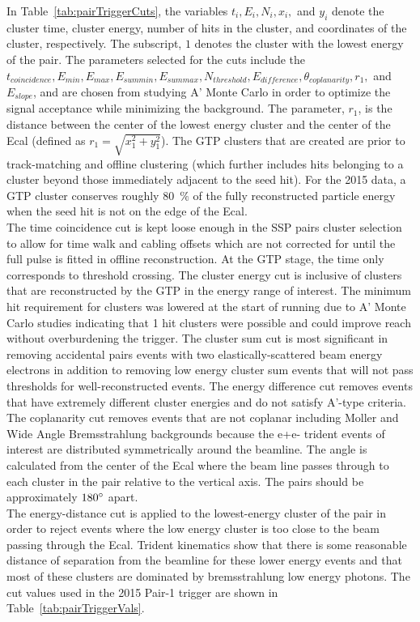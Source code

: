 \documentclass[12pt]{report}
\begin{document}
In Table~\ref{tab:pairTriggerCuts}, the variables $t_i,E_i, N_i, x_i,$ and $y_i$ denote the cluster time, cluster energy, number of hits in the cluster, and coordinates of the cluster, respectively. The subscript, $1$ denotes the cluster with the lowest energy of the pair. The parameters selected for the cuts include the $t_{coincidence}, E_{min}, E_{max}, E_{sum min}, E_{sum max}, N_{threshold}, E_{difference}, \theta_{coplanarity}, r_{1},$ and $E_{slope}$, and are chosen from studying A' Monte Carlo in order to optimize the signal acceptance while minimizing the background. The parameter, $r_1$, is the distance between the center of the lowest energy cluster and the center of the Ecal (defined as $r_1=\sqrt{x_1^2+y_1^2}$). The GTP clusters that are created are prior to track-matching and offline clustering (which further includes hits belonging to a cluster beyond those immediately adjacent to the seed hit). For the 2015 data, a GTP cluster conserves roughly 80~$\%$ of the fully reconstructed particle energy when the seed hit is not on the edge of the Ecal. \\
\indent The time coincidence cut is kept loose enough in the SSP pairs cluster selection to allow for time walk and cabling offsets which are not corrected for until the full pulse is fitted in offline reconstruction. At the GTP stage, the time only corresponds to threshold crossing. The cluster energy cut is inclusive of clusters that are reconstructed by the GTP in the energy range of interest. The minimum hit requirement for clusters was lowered at the start of running due to A' Monte Carlo studies indicating that 1 hit clusters were possible and could improve reach without overburdening the trigger. The cluster sum cut is most significant in removing accidental pairs events with two elastically-scattered beam energy electrons in addition to removing low energy cluster sum events that will not pass thresholds for well-reconstructed events. The energy difference cut removes events that have extremely different cluster energies and do not satisfy A'-type criteria. \\
\indent The coplanarity cut removes events that are not coplanar including Moller and Wide Angle Bremsstrahlung backgrounds because the e+e- trident events of interest are distributed symmetrically around the beamline. The angle is calculated from the center of the Ecal where the beam line passes through to each cluster in the pair relative to the vertical axis. The pairs should be approximately $180\degree$ apart. \\
\indent The energy-distance cut is applied to the lowest-energy cluster of the pair in order to reject events where the low energy cluster is too close to the beam passing through the Ecal. Trident kinematics show that there is some reasonable distance of separation from the beamline for these lower energy events and that most of these clusters are dominated by bremsstrahlung low energy photons. 
\indent The cut values used in the 2015 Pair-1 trigger are shown in Table~\ref{tab:pairTriggerVals}.
\end{document}
